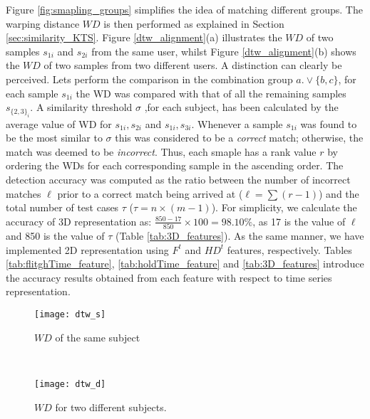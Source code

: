 \documentclass[runningheads,a4paper]{llncs}
\begin{document}
\noindent Figure \ref{fig:smapling_groups} simplifies the idea of matching different groups. The warping distance $WD$ is then performed as explained in Section \ref{sec:similarity_KTS}. Figure \ref{dtw_alignment}(a) illustrates the $WD$ of two samples $s_{1i}$ and $s_{2i}$ from the same user, whilst Figure \ref{dtw_alignment}(b) shows the $WD$ of two samples from two different users. A distinction can clearly be perceived. Lets perform the comparison in the combination group $a.\vee\{b,c\}$, for each sample $s_{1i}$ the WD was compared with that of all the remaining samples $s_{\{2,3\}_i}$. A similarity threshold $\sigma$ ,for each subject, has been calculated by the average value of WD for $s_{1i},s_{2i}$ and $s_{1i},s_{3i}$. Whenever a sample $s_{1i}$ was found to be the most similar to $\sigma$ this was considered to be a \emph{correct} match; otherwise, the match was deemed to be \emph{incorrect}. Thus, each smaple has a rank value $r$ by ordering the WDs for each corresponding sample in the ascending order. The detection accuracy was computed as the ratio between the number of incorrect matches $\ell$ prior to a correct match being arrived at ($\ell= \sum{(r-1)}$) and the total number of test cases $\tau$ ($\tau=n\times(m-1)$). For simplicity, we calculate the accuracy of 3D representation as: $\frac{850-17}{850} \times 100 = 98.10\%$, as 17 is the value of $\ell$ and 850 is the value of $\tau$ (Table \ref{tab:3D_features}). As the same manner, we have implemented 2D representation using $F^t$ and $HD^t$ features, respectively. Tables \ref{tab:flitghTime_feature}, \ref{tab:holdTime_feature} and \ref{tab:3D_features} introduce the accuracy results obtained from each feature with respect to time series representation. 

\begin{figure*}
    \centering
    \begin{subfigure}[b]{0.4\textwidth}
        \texttt{[image: dtw\_s]}
        \caption{$WD$ of the same subject}
        \label{fig:wd_after}
    \end{subfigure}\quad
    ~ %
    \begin{subfigure}[b]{0.4\textwidth}
        \texttt{[image: dtw\_d]}
        \caption{$WD$ for two different subjects.}
        \label{fig:wd_before}
    \end{subfigure}
    \caption{Application of DTW. It can be observed that the $WD$ is more alignment in \textbf{(a)} as the sequencing of two time series for the same subject.}
    \label{dtw_alignment}
\end{figure*}
    
\end{document}
